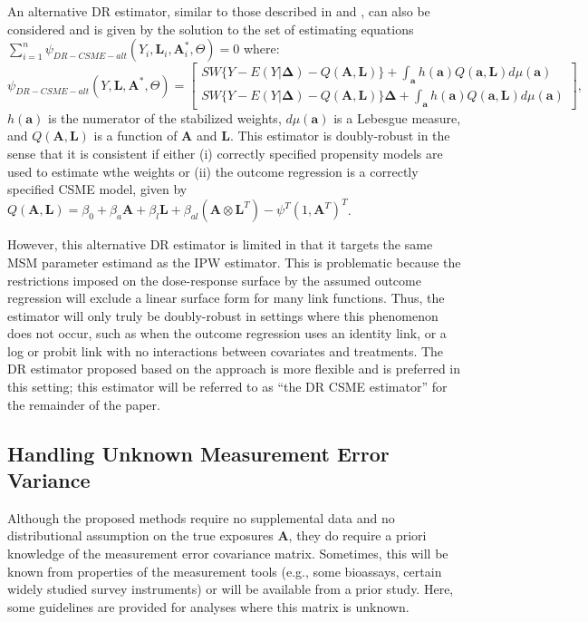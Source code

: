 \documentclass[useAMS,usenatbib,referee]{biom}
\begin{document}
An alternative DR estimator, similar to those described in \citet{robins2000b} and \citet{neugebauer2005}, can also be considered and is given by the solution to the set of estimating equations $\sum_{i=1}^{n} \psi_{DR-CSME-alt}(Y_{i}, \bm{L}_{i}, \bm{A}^{*}_{i}, \Theta) = 0$ where:
\begin{equation*}
    \psi_{DR-CSME-alt}(Y, \bm{L}, \bm{A}^{*}, \Theta) =
    \begin{bmatrix}
       SW \{ Y - E(Y | \bm{\Delta}) - Q(\bm{A}, \bm{L}) \} + \int_{\bm{a}} h(\bm{a})Q(\bm{a}, \bm{L})d\mu (\bm{a}) \\
       SW \{ Y - E(Y | \bm{\Delta}) - Q(\bm{A}, \bm{L}) \} \bm{\Delta} + \int_{\bm{a}} h(\bm{a})Q(\bm{a}, \bm{L})d\mu (\bm{a})
    \end{bmatrix},
\end{equation*}
$h(\bm{a})$ is the numerator of the stabilized weights, $d\mu (\bm{a})$ is a Lebesgue measure, and $Q(\bm{A}, \bm{L})$ is a function of $\bm{A}$ and $\bm{L}$. This estimator is doubly-robust in the sense that it is consistent if either (i) correctly specified propensity models are used to estimate wthe weights or (ii) the outcome regression is a correctly specified CSME model, given by $Q(\bm{A}, \bm{L}) = \beta_{0} + \beta_{a}\bm{A} + \beta_{l}\bm{L} + \beta_{al}(\bm{A} \otimes \bm{L}^{T}) - \psi^{T}(1, \bm{A}^{T})^{T}$.

However, this alternative DR estimator is limited in that it targets the same MSM parameter estimand as the IPW estimator. This is problematic because the restrictions imposed on the dose-response surface by the assumed outcome regression will exclude a linear surface form for many link functions. Thus, the estimator will only truly be doubly-robust in settings where this phenomenon does not occur, such as when the outcome regression uses an identity link, or a log or probit link with no interactions between covariates and treatments. The DR estimator proposed based on the \citet{hirano2001} approach is more flexible and is preferred in this setting; this estimator will be referred to as ``the DR CSME estimator'' for the remainder of the paper.

\subsection{Handling Unknown Measurement Error Variance}

Although the proposed methods require no supplemental data and no distributional assumption on the true exposures $\bm{A}$, they do require a priori knowledge of the measurement error covariance matrix. Sometimes, this will be known from properties of the measurement tools (e.g., some bioassays, certain widely studied survey instruments) or will be available from a prior study. Here, some guidelines are provided for analyses where this matrix is unknown.
\end{document}
